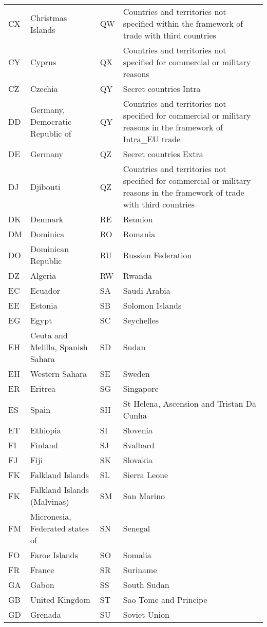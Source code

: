 {\begin{longtable}{lp{5cm}||lp{5cm}}
 CX & Christmas Islands & QW & Countries and territories not specified within the framework of trade with third countries \\
 CY & Cyprus & QX & Countries and territories not specified for commercial or military reasons \\
 CZ & Czechia & QY & Secret countries Intra \\
 DD & Germany, Democratic Republic of & QY & Countries and territories not specified for commercial or military reasons in the framework of Intra\_EU trade \\
 DE & Germany & QZ & Secret countries Extra \\
 DJ & Djibouti & QZ & Countries and territories not specified for commercial or military reasons in the framework of trade with third countries \\
 DK & Denmark & RE & Reunion \\
 DM & Dominica & RO & Romania \\
 DO & Dominican Republic & RU & Russian Federation \\
 DZ & Algeria & RW & Rwanda \\
 EC & Ecuador & SA & Saudi Arabia \\
 EE & Estonia & SB & Solomon Islands \\
 EG & Egypt & SC & Seychelles \\
 EH & Ceuta and Melilla, Spanish Sahara & SD & Sudan \\
 EH & Western Sahara & SE & Sweden \\
 ER & Eritrea & SG & Singapore \\
 ES & Spain & SH & St Helena, Ascension and Tristan Da Cunha \\
 ET & Ethiopia & SI & Slovenia \\
 FI & Finland & SJ & Svalbard \\
 FJ & Fiji & SK & Slovakia \\
 FK & Falkland Islands & SL & Sierra Leone \\
 FK & Falkland Islands (Malvinas) & SM & San Marino \\
 FM & Micronesia, Federated states of & SN & Senegal \\
 FO & Faroe Islands & SO & Somalia \\
 FR & France & SR & Suriname \\
 GA & Gabon & SS & South Sudan \\
 GB & United Kingdom & ST & Sao Tome and Principe \\
 GD & Grenada & SU & Soviet Union \\

\end{longtable}}

